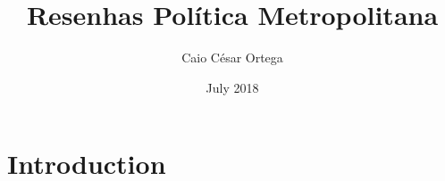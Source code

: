 \documentclass{article}
\title{Resenhas Política Metropolitana}
\author{Caio César Ortega}
\date{July 2018}
\begin{document}
\maketitle

\section{Introduction}
\end{document}
